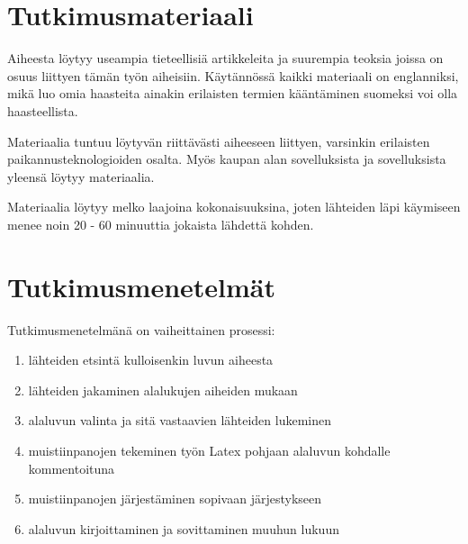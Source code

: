 \documentclass[12pt,a4paper,finnish,oneside]{article}
\begin{document}


\section{Tutkimusmateriaali}

Aiheesta löytyy useampia tieteellisiä artikkeleita ja suurempia teoksia joissa on osuus liittyen tämän työn aiheisiin. Käytännössä kaikki materiaali on englanniksi, mikä luo omia haasteita ainakin erilaisten termien kääntäminen suomeksi voi olla haasteellista.

Materiaalia tuntuu löytyvän riittävästi aiheeseen liittyen, varsinkin erilaisten paikannusteknologioiden osalta. Myös kaupan alan  sovelluksista ja sovelluksista yleensä löytyy materiaalia.

Materiaalia löytyy melko laajoina kokonaisuuksina, joten lähteiden läpi käymiseen menee noin 20 - 60 minuuttia jokaista lähdettä kohden.



\section{Tutkimusmenetelmät}

Tutkimusmenetelmänä on vaiheittainen prosessi:
\begin{enumerate}
\item lähteiden etsintä kulloisenkin luvun aiheesta
\item lähteiden jakaminen alalukujen aiheiden mukaan
\item alaluvun valinta ja sitä vastaavien lähteiden lukeminen
\item muistiinpanojen tekeminen työn Latex pohjaan alaluvun kohdalle kommentoituna
\item muistiinpanojen järjestäminen sopivaan järjestykseen
\item alaluvun kirjoittaminen ja sovittaminen muuhun lukuun
\end{enumerate}
\end{document}
